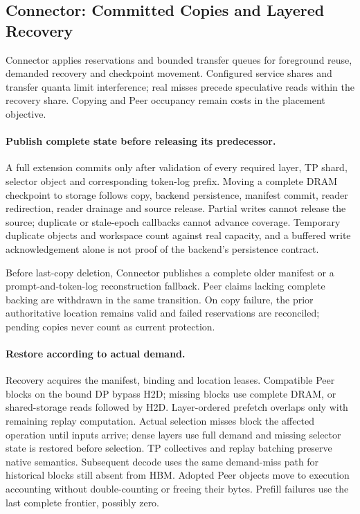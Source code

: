 \subsection{Connector: Committed Copies and Layered Recovery}
\label{sec:connector}

Connector applies reservations and bounded transfer queues for foreground
reuse, demanded recovery and checkpoint movement. Configured service
shares and transfer quanta limit interference; real misses precede
speculative reads within the recovery share. Copying and Peer occupancy
remain costs in the placement objective.

\paragraph{Publish complete state before releasing its predecessor.}
A full extension commits only after validation of every required layer,
TP shard, selector object and corresponding token-log prefix. Moving a
complete DRAM checkpoint to storage follows copy, backend persistence,
manifest commit, reader redirection, reader drainage and source release.
Partial writes cannot release the source; duplicate or stale-epoch
callbacks cannot advance coverage. Temporary duplicate objects and
workspace count against real capacity, and a buffered write acknowledgement
alone is not proof of the backend's persistence contract.

Before last-copy deletion, Connector publishes a complete older manifest
or a prompt-and-token-log reconstruction fallback. Peer claims lacking
complete backing are withdrawn in the same transition. On copy failure,
the prior authoritative location remains valid and failed reservations
are reconciled; pending copies never count as current protection.

\paragraph{Restore according to actual demand.}
Recovery acquires the manifest, binding and location leases. Compatible
Peer blocks on the bound DP bypass H2D; missing blocks use complete DRAM,
or shared-storage reads followed by H2D. Layer-ordered prefetch overlaps
only with remaining replay computation. Actual selection misses block
the affected operation until inputs arrive; dense layers use full demand
and missing selector state is restored before selection. TP collectives
and replay batching preserve native semantics. Subsequent decode uses the
same demand-miss path for historical blocks still absent from HBM.
Adopted Peer objects move
to execution accounting without double-counting or freeing their bytes.
Prefill failures use the last complete frontier, possibly zero.


